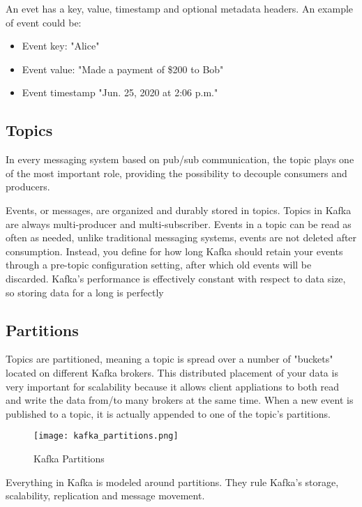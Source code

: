 An evet has a key, value, timestamp and optional metadata headers. An example
of event could be:

\begin{itemize}
    \item   Event key: "Alice"
    \item   Event value: "Made a payment of \$200 to Bob"
    \item   Event timestamp "Jun. 25, 2020 at 2:06 p.m."
\end{itemize}

\subsection{Topics}

In every messaging system based on pub/sub communication, the topic plays one
of the most important role, providing the possibility to decouple consumers
and producers.

Events, or messages, are organized and durably stored in topics.
Topics in Kafka are always multi-producer and multi-subscriber.
Events in a topic can be read as often as needed, unlike traditional messaging
systems, events are not deleted after consumption. Instead, you define for how
long Kafka should retain your events through a pre-topic configuration setting,
after which old events will be discarded. Kafka's performance is effectively
constant with respect to data size, so storing data for a long is perfectly

\subsection{Partitions}

Topics are partitioned, meaning a topic is spread over a number of "buckets"
located on different Kafka brokers.
This distributed placement of your data is very important for scalability
because it allows client appliations to both read and write the data from/to
many brokers at the same time. When a new event is published to a topic, it is
actually appended to one of the topic's partitions.

\begin{figure}[ht]
    \centering
    \texttt{[image: kafka\_partitions.png]}
    \caption{Kafka Partitions}
\end{figure}

Everything in Kafka is modeled around partitions. They rule Kafka's storage,
scalability, replication and message movement.

